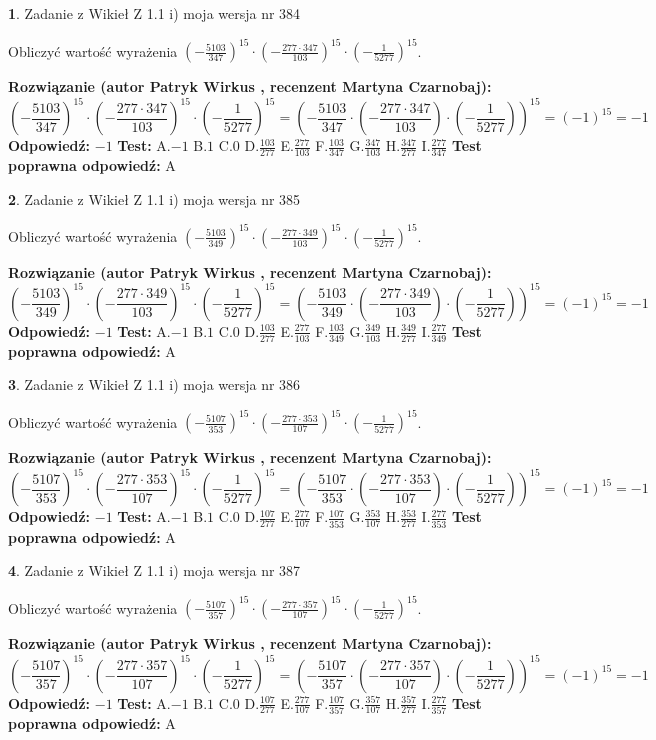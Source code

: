\documentclass[12pt, a4paper]{article}
\theoremstyle{definition} %
\newtheorem{zad}{}
\newcommand{\zadStart}[1]{\begin{zad}#1\newline}
\newcommand{\zadStop}{\end{zad}}
\newcommand{\rozwStart}[2]{\noindent \textbf{Rozwiązanie (autor #1 , recenzent #2): }\newline}
\newcommand{\rozwStop}{\newline}
\newcommand{\odpStart}{\noindent \textbf{Odpowiedź:}\newline}
\newcommand{\odpStop}{\newline}
\newcommand{\testStart}{\noindent \textbf{Test:}\newline}
\newcommand{\testStop}{\newline}
\newcommand{\kluczStart}{\noindent \textbf{Test poprawna odpowiedź:}\newline}
\newcommand{\kluczStop}{\newline}
\begin{document}
\zadStart{Zadanie z Wikieł Z 1.1 i) moja wersja nr 384}

Obliczyć wartość wyrażenia $(-\frac{5103}{347})^{15} \cdot (-\frac{277 \cdot 347}{103})^{15} \cdot (-\frac{1}{5277})^{15}$.
\zadStop
\rozwStart{Patryk Wirkus}{Martyna Czarnobaj}
$$(-\frac{5103}{347})^{15} \cdot (-\frac{277 \cdot 347}{103})^{15} \cdot (-\frac{1}{5277})^{15} = (-\frac{5103}{347} \cdot (-\frac{277 \cdot 347}{103}) \cdot (-\frac{1}{5277}))^{15} = (-1)^{15} = -1$$
\rozwStop
\odpStart
$-1$
\odpStop
\testStart
A.$-1$ B.$1$ C.$0$ D.$\frac{103}{277}$ E.$\frac{277}{103}$
F.$\frac{103}{347}$ G.$\frac{347}{103}$
H.$\frac{347}{277}$
I.$\frac{277}{347}$
\testStop
\kluczStart
A
\kluczStop



\zadStart{Zadanie z Wikieł Z 1.1 i) moja wersja nr 385}

Obliczyć wartość wyrażenia $(-\frac{5103}{349})^{15} \cdot (-\frac{277 \cdot 349}{103})^{15} \cdot (-\frac{1}{5277})^{15}$.
\zadStop
\rozwStart{Patryk Wirkus}{Martyna Czarnobaj}
$$(-\frac{5103}{349})^{15} \cdot (-\frac{277 \cdot 349}{103})^{15} \cdot (-\frac{1}{5277})^{15} = (-\frac{5103}{349} \cdot (-\frac{277 \cdot 349}{103}) \cdot (-\frac{1}{5277}))^{15} = (-1)^{15} = -1$$
\rozwStop
\odpStart
$-1$
\odpStop
\testStart
A.$-1$ B.$1$ C.$0$ D.$\frac{103}{277}$ E.$\frac{277}{103}$
F.$\frac{103}{349}$ G.$\frac{349}{103}$
H.$\frac{349}{277}$
I.$\frac{277}{349}$
\testStop
\kluczStart
A
\kluczStop



\zadStart{Zadanie z Wikieł Z 1.1 i) moja wersja nr 386}

Obliczyć wartość wyrażenia $(-\frac{5107}{353})^{15} \cdot (-\frac{277 \cdot 353}{107})^{15} \cdot (-\frac{1}{5277})^{15}$.
\zadStop
\rozwStart{Patryk Wirkus}{Martyna Czarnobaj}
$$(-\frac{5107}{353})^{15} \cdot (-\frac{277 \cdot 353}{107})^{15} \cdot (-\frac{1}{5277})^{15} = (-\frac{5107}{353} \cdot (-\frac{277 \cdot 353}{107}) \cdot (-\frac{1}{5277}))^{15} = (-1)^{15} = -1$$
\rozwStop
\odpStart
$-1$
\odpStop
\testStart
A.$-1$ B.$1$ C.$0$ D.$\frac{107}{277}$ E.$\frac{277}{107}$
F.$\frac{107}{353}$ G.$\frac{353}{107}$
H.$\frac{353}{277}$
I.$\frac{277}{353}$
\testStop
\kluczStart
A
\kluczStop



\zadStart{Zadanie z Wikieł Z 1.1 i) moja wersja nr 387}

Obliczyć wartość wyrażenia $(-\frac{5107}{357})^{15} \cdot (-\frac{277 \cdot 357}{107})^{15} \cdot (-\frac{1}{5277})^{15}$.
\zadStop
\rozwStart{Patryk Wirkus}{Martyna Czarnobaj}
$$(-\frac{5107}{357})^{15} \cdot (-\frac{277 \cdot 357}{107})^{15} \cdot (-\frac{1}{5277})^{15} = (-\frac{5107}{357} \cdot (-\frac{277 \cdot 357}{107}) \cdot (-\frac{1}{5277}))^{15} = (-1)^{15} = -1$$
\rozwStop
\odpStart
$-1$
\odpStop
\testStart
A.$-1$ B.$1$ C.$0$ D.$\frac{107}{277}$ E.$\frac{277}{107}$
F.$\frac{107}{357}$ G.$\frac{357}{107}$
H.$\frac{357}{277}$
I.$\frac{277}{357}$
\testStop
\kluczStart
A
\kluczStop
\end{document}
